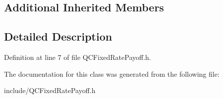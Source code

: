 \subsection*{Additional Inherited Members}


\subsection{Detailed Description}


Definition at line 7 of file Q\+C\+Fixed\+Rate\+Payoff.\+h.



The documentation for this class was generated from the following file\+:\begin{DoxyCompactItemize}
\item 
include/Q\+C\+Fixed\+Rate\+Payoff.\+h\end{DoxyCompactItemize}
